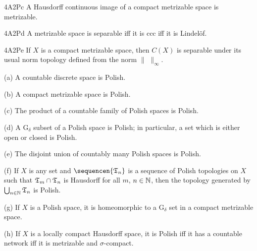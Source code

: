 \spheader 4A2Pc A Hausdorff continuous image of a compact metrizable space
is metrizable.

\spheader 4A2Pd A metrizable space is separable iff it is ccc iff it is
Lindel\"of.

\spheader 4A2Pe If $X$ is a compact metrizable space, then $C(X)$ is
separable under its usual norm topology defined from the norm
$\|\,\,\|_{\infty}$.

(a) A countable discrete space is Polish.

(b) A compact metrizable space is Polish.

(c) The product of a countable family of Polish spaces is Polish.

(d) A G$_{\delta}$ subset of a Polish space is Polish;  in particular, a set which is either open or closed
is Polish.

(e) The disjoint union of countably many Polish spaces is Polish.

(f) If $X$ is any set and $\sequencen{\frak T_n}$ is a sequence of
Polish topologies on $X$ such that $\frak T_m\cap\frak T_n$ is Hausdorff
for all $m$, $n\in\Bbb N$, then the
topology
generated by $\bigcup_{n\in\Bbb N}\frak T_n$ is Polish.

(g) If $X$ is a Polish space, it is homeomorphic to a G$_{\delta}$ set
in a compact metrizable space.

(h) If $X$ is a locally compact Hausdorff space, it is Polish iff it has a
countable network iff it is metrizable and $\sigma$-compact.

